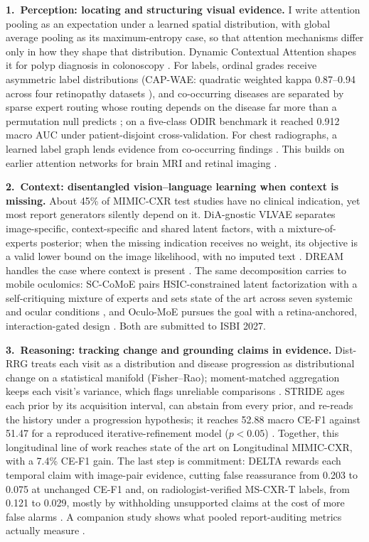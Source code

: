 \documentclass[10pt,letterpaper]{article}
\begin{document}
\textbf{1.\ Perception: locating and structuring visual evidence.} I write attention pooling as an expectation under a learned spatial distribution, with global average pooling as its maximum-entropy case, so that attention mechanisms differ only in how they shape that distribution. Dynamic Contextual Attention shapes it for polyp diagnosis in colonoscopy \cite{dcan}. For labels, ordinal grades receive asymmetric label distributions (CAP-WAE: quadratic weighted kappa 0.87--0.94 across four retinopathy datasets \cite{capwae}), and co-occurring diseases are separated by sparse expert routing whose routing depends on the disease far more than a permutation null predicts \cite{routing}; on a five-class ODIR benchmark it reached 0.912 macro AUC under patient-disjoint cross-validation. For chest radiographs, a learned label graph lends evidence from co-occurring findings \cite{ctwoa}. This builds on earlier attention networks for brain MRI and retinal imaging \cite{ssanet,gcg}.

\textbf{2.\ Context: disentangled vision--language learning when context is missing.} About 45\% of MIMIC-CXR test studies have no clinical indication, yet most report generators silently depend on it. DiA-gnostic VLVAE separates image-specific, context-specific and shared latent factors, with a mixture-of-experts posterior; when the missing indication receives no weight, its objective is a valid lower bound on the image likelihood, with no imputed text \cite{dia}. DREAM handles the case where context is present \cite{dream}. The same decomposition carries to mobile oculomics: SC-CoMoE pairs HSIC-constrained latent factorization with a self-critiquing mixture of experts and sets state of the art across seven systemic and ocular conditions \cite{scomoe}, and Oculo-MoE pursues the goal with a retina-anchored, interaction-gated design \cite{oculomoe}. Both are submitted to ISBI 2027.

\textbf{3.\ Reasoning: tracking change and grounding claims in evidence.} Dist-RRG treats each visit as a distribution and disease progression as distributional change on a statistical manifold (Fisher--Rao); moment-matched aggregation keeps each visit's variance, which flags unreliable comparisons \cite{distrrg}. STRIDE ages each prior by its acquisition interval, can abstain from every prior, and re-reads the history under a progression hypothesis; it reaches 52.88 macro CE-F1 against 51.47 for a reproduced iterative-refinement model ($p<0.05$) \cite{stride}. Together, this longitudinal line of work reaches state of the art on Longitudinal MIMIC-CXR, with a 7.4\% CE-F1 gain. The last step is commitment: DELTA rewards each temporal claim with image-pair evidence, cutting false reassurance from 0.203 to 0.075 at unchanged CE-F1 and, on radiologist-verified MS-CXR-T labels, from 0.121 to 0.029, mostly by withholding unsupported claims at the cost of more false alarms \cite{delta}. A companion study shows what pooled report-auditing metrics actually measure \cite{evidence}.
\end{document}
